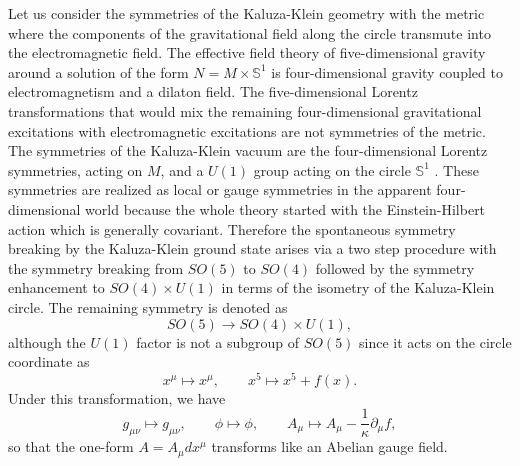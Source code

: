 \documentclass[12pt,epsf]{article}
\begin{document}
Let us consider the symmetries of the Kaluza-Klein geometry with the metric  where the components of
the gravitational field along the circle transmute into the electromagnetic field.
The effective field theory of five-dimensional gravity around a solution of the form $N = M \times \mathbb{S}^1$
is four-dimensional gravity coupled to electromagnetism and a dilaton field.
The five-dimensional Lorentz transformations that would mix the remaining four-dimensional gravitational excitations
with electromagnetic excitations are not symmetries of the metric.
The symmetries of the Kaluza-Klein vacuum  are the four-dimensional Lorentz symmetries, acting on $M$,
and a $U(1)$ group acting on the circle $\mathbb{S}^1$  \cite{kk-witten,kk-book}.
These symmetries are realized as local or gauge symmetries in the apparent four-dimensional world
because the whole theory started with the Einstein-Hilbert action 
which is generally covariant. Therefore the spontaneous symmetry breaking by the Kaluza-Klein ground state 
arises via a two step procedure with the symmetry breaking from $SO(5)$ to $SO(4)$ followed by the symmetry enhancement to
$SO(4) \times U(1)$ in terms of the isometry of the Kaluza-Klein circle.
The remaining symmetry is denoted as
\begin{equation}\label{symm-break}
  SO(5) \to SO(4) \times U(1),
\end{equation}
although the $U(1)$ factor is not a subgroup of $SO(5)$ since it acts on the circle coordinate as
\begin{equation}\label{5th-u1}
  x^\mu \mapsto x^\mu, \qquad x^5 \mapsto x^5 + f(x).
\end{equation}
Under this transformation, we have
\begin{equation}\label{kk-tran}
  g_{\mu\nu} \mapsto  g_{\mu\nu}, \qquad \phi \mapsto \phi,
  \qquad A_{\mu} \mapsto  A_{\mu} - \frac{1}{\kappa} \partial_\mu f,
\end{equation}
so that the one-form $A = A_\mu dx^\mu$ transforms like an Abelian gauge field.
\end{document}
